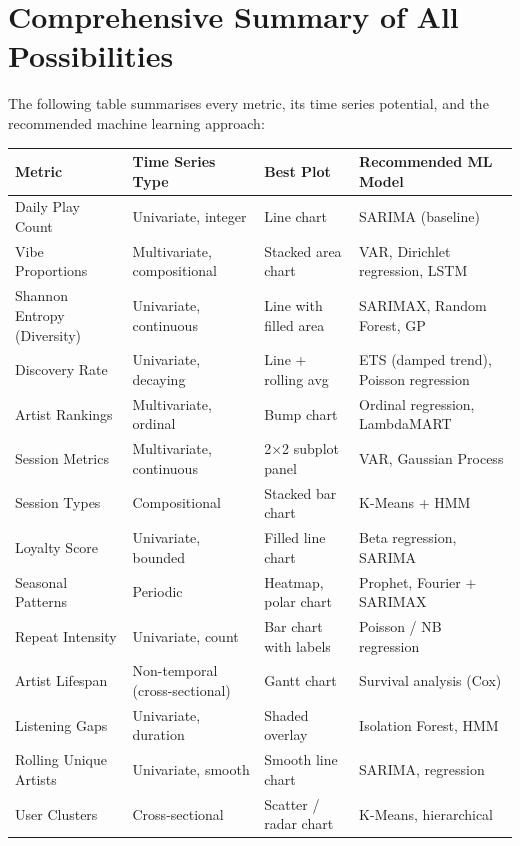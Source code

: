\documentclass[12pt, a4paper]{article}
\begin{document}
\section{Comprehensive Summary of All Possibilities}

The following table summarises every metric, its time series potential,
and the recommended machine learning approach:

\begin{center}
\small
\begin{tabular}{p{3.2cm}p{3cm}p{3.5cm}p{4cm}}
    \toprule
    \textbf{Metric} & \textbf{Time Series Type} & \textbf{Best Plot} &
    \textbf{Recommended ML Model} \\
    \midrule
    Daily Play Count
        & Univariate, integer
        & Line chart
        & SARIMA (baseline) \\[4pt]
    Vibe Proportions
        & Multivariate, compositional
        & Stacked area chart
        & VAR, Dirichlet regression, LSTM \\[4pt]
    Shannon Entropy (Diversity)
        & Univariate, continuous
        & Line with filled area
        & SARIMAX, Random Forest, GP \\[4pt]
    Discovery Rate
        & Univariate, decaying
        & Line + rolling avg
        & ETS (damped trend), Poisson regression \\[4pt]
    Artist Rankings
        & Multivariate, ordinal
        & Bump chart
        & Ordinal regression, LambdaMART \\[4pt]
    Session Metrics
        & Multivariate, continuous
        & 2$\times$2 subplot panel
        & VAR, Gaussian Process \\[4pt]
    Session Types
        & Compositional
        & Stacked bar chart
        & K-Means + HMM \\[4pt]
    Loyalty Score
        & Univariate, bounded
        & Filled line chart
        & Beta regression, SARIMA \\[4pt]
    Seasonal Patterns
        & Periodic
        & Heatmap, polar chart
        & Prophet, Fourier + SARIMAX \\[4pt]
    Repeat Intensity
        & Univariate, count
        & Bar chart with labels
        & Poisson / NB regression \\[4pt]
    Artist Lifespan
        & Non-temporal (cross-sectional)
        & Gantt chart
        & Survival analysis (Cox) \\[4pt]
    Listening Gaps
        & Univariate, duration
        & Shaded overlay
        & Isolation Forest, HMM \\[4pt]
    Rolling Unique Artists
        & Univariate, smooth
        & Smooth line chart
        & SARIMA, regression \\[4pt]
    User Clusters
        & Cross-sectional
        & Scatter / radar chart
        & K-Means, hierarchical \\
    \bottomrule
\end{tabular}
\end{center}
\end{document}
